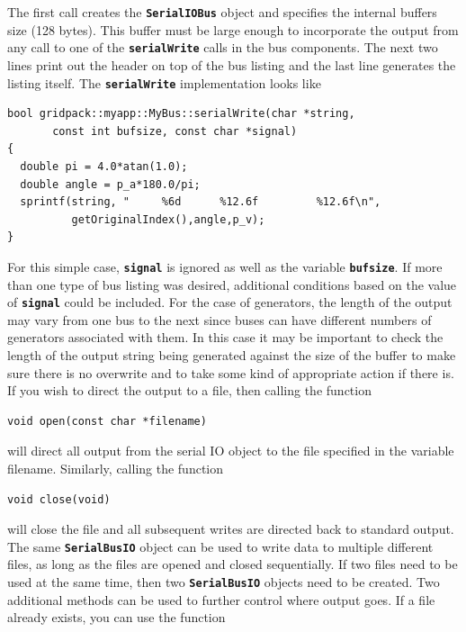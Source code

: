 \documentclass[12pt]{report} %
\begin{document}
The first call creates the \texttt{\textbf{SerialIOBus}} object and specifies the internal buffers size (128 bytes). This buffer must be large enough to incorporate the output from any call to one of the \texttt{\textbf{serialWrite}} calls in the bus components. The next two lines print out the header on top of the bus listing and the last line generates the listing itself. The \texttt{\textbf{serialWrite}} implementation looks like

{
\color{red}
\begin{Verbatim}[fontseries=b]
bool gridpack::myapp::MyBus::serialWrite(char *string,
       const int bufsize, const char *signal)
{  
  double pi = 4.0*atan(1.0);
  double angle = p_a*180.0/pi;
  sprintf(string, "     %6d      %12.6f         %12.6f\n",
          getOriginalIndex(),angle,p_v);
}
\end{Verbatim}
}

For this simple case, \texttt{\textbf{signal}} is ignored as well as the variable \texttt{\textbf{bufsize}}. If more than one type of bus listing was desired, additional conditions based on the value of \texttt{\textbf{signal}} could be included. For the case of generators, the length of the output may vary from one bus to the next since buses can have different numbers of generators associated with them. In this case it may be important to check the length of the output string being generated against the size of the buffer to make sure there is no overwrite and to take some kind of appropriate action if there is.
If you wish to direct the output to a file, then calling the function

{
\color{red}
\begin{Verbatim}[fontseries=b]
void open(const char *filename)
\end{Verbatim}
}

will direct all output from the serial IO object to the file specified in the variable filename. Similarly, calling the function

{
\color{red}
\begin{Verbatim}[fontseries=b]
void close(void)
\end{Verbatim}
}

will close the file and all subsequent writes are directed back to standard output. The same \texttt{\textbf{SerialBusIO}} object can be used to write data to multiple different files, as long as the files are opened and closed sequentially. If two files need to be used at the same time, then two \texttt{\textbf{SerialBusIO}} objects need to be created. Two additional methods can be used to further control where output goes. If a file already exists, you can use the function
\end{document}
